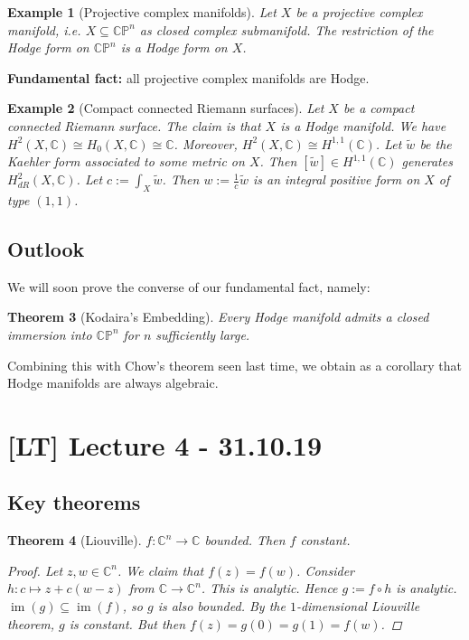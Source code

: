 \documentclass[12pt]{article}
\theoremstyle{darkgreentheorem}
\newtheorem{thm}{Theorem}[section]
\theoremstyle{darkbluedefinition}
\theoremstyle{darkredexample}
\newtheorem{exa}[thm]{Example}
\theoremstyle{remark}
\newcommand{\1}{\mathbbm{1}}
\newcommand{\C}{\mathbb{C}}
\newcommand{\CP}{\mathbb{CP}}
\DeclareMathOperator{\im}{im}
\begin{document}
\begin{exa}[Projective complex manifolds]
    Let $X$ be a projective complex manifold, i.e. $X\subseteq \CP^{n}$ as closed complex submanifold.
    The restriction of the Hodge form on $\CP^{n}$ is a Hodge form on $X$.
\end{exa}

\textbf{Fundamental fact:} all projective complex manifolds are Hodge.

\begin{exa}[Compact connected Riemann surfaces]
    Let $X$ be a compact connected Riemann surface.
    The claim is that $X$ is a Hodge manifold.
    We have $H^{2}(X,\C)\cong H_{0}(X,\C)\cong \C$.
    Moreover, $H^{2}(X,\C)\cong H^{1,1}(\C)$.
    Let $\tilde{w}$ be the Kaehler form associated to some metric on $X$.
    Then $[\tilde{w}]\in H^{1,1}(\C)$ generates $H_{dR}^{2}(X,\C)$.
    Let $c:=\int_{X}\tilde{w}$.
    Then $w:=\frac{1}{c}\tilde{w}$ is an integral positive form on $X$ of type $(1,1)$.
\end{exa}

\subsection{Outlook}

We will soon prove the converse of our fundamental fact, namely:

\begin{thm}[Kodaira's Embedding]
    Every Hodge manifold admits a closed immersion into $\CP^{n}$ for $n$ sufficiently large.
\end{thm}

Combining this with Chow's theorem seen last time, we obtain as a corollary that Hodge manifolds are always algebraic.

\section{[LT] Lecture 4 - 31.10.19}

\subsection{Key theorems}

\begin{thm}[Liouville]
    $f\colon \C^{n}\to \C$ bounded.
    Then $f$ constant.
    \begin{proof}
	Let $z,w\in \C^{n}$.
	We claim that $f(z)=f(w)$.
	Consider $h\colon c\mapsto z+c(w-z)$ from $\C\to \C^{n}$.
	This is analytic.
	Hence $g:=f\circ h$ is analytic.
	$\im(g)\subseteq \im(f)$, so $g$ is also bounded.
	By the $1$-dimensional Liouville theorem, $g$ is constant.
	But then $f(z)=g(0)=g(1)=f(w)$.
    \end{proof}
\end{thm}
\end{document}
